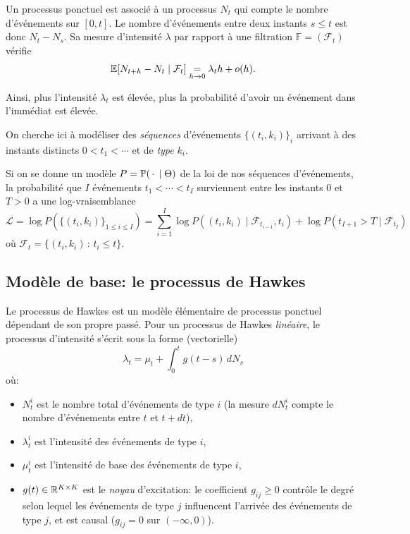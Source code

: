 \documentclass[../main.tex]{subfiles}
\begin{document}
Un processus ponctuel est associé à un processus $N_t$ qui compte le nombre d'événements sur $[0,t]$. Le nombre d'événements entre deux instants $s\leq t$ est donc $N_t - N_s$. Sa mesure d'intensité $\lambda$ par rapport à une filtration $\mathds F = (\mathcal{F}_t)$ vérifie\footnotemark
\[
	\mathbb{E} [N_{t+h} - N_t \mid \mathcal{F}_t] \underset{h\to 0}{=} \lambda_th + o(h).
\]

Ainsi, plus l'intensité $\lambda_t$ est élevée, plus la probabilité d'avoir un événement dans l'immédiat est élevée.

On cherche ici à modéliser des \textit{séquences} d'événements ${\{(t_i,k_i)\}}_i$ arrivant à des instants distincts $0<t_1 < \cdots$ et de \textit{type} $k_i$.

Si on se donne un modèle $P = \mathbb{P}(\,\cdot\,\mid \Theta)$ de la loi de nos séquences d'événements, la probabilité que $I$ événements $t_1<\cdots<t_I$ surviennent entre les instants $0$ et $T > 0$ a une log-vraisemblance
\begin{equation}\label{eq:likelihood}
	\mathcal{L} =
	\log P(\{(t_i,k_i)\}_{1\leq i\leq I}) =
	\sum_{i=1}^{I} \log P((t_i,k_i)\mid \mathcal{F}_{t_{i-1}}, t_i)
	+ \log P(t_{I+1}>T\mid \mathcal{F}_{t_{I}})
\end{equation}
où $\mathcal{F}_t = \{ (t_i,k_i)\,:\, t_i \leq t \}$.


\subsection{Modèle de base: le processus de Hawkes}

Le processus de Hawkes est un modèle élémentaire de processus ponctuel dépendant de son propre passé. Pour un processus de Hawkes \textit{linéaire}, le processus d'intensité s'écrit sous la forme (vectorielle)
\begin{equation}
\lambda_t = \mu_t + \int_0^t g(t-s)\,dN_s
\end{equation}
où:\begin{itemize}
	\item $N^i_t$ est le nombre total d'événements de type $i$ (la mesure $dN^i_t$ compte le nombre d'événements entre $t$ et $t+dt$),
	\item $\lambda_t^i$ est l'intensité des événements de type $i$,
	\item $\mu^i_t$ est l'intensité de base des événements de type $i$,
	\item $g(t) \in \mathbb{R}^{K\times K}$ est le \textit{noyau} d'excitation: le coefficient $g_{ij} \geq 0$ contrôle le degré selon lequel les événements de type $j$ influencent l'arrivée des événements de type $j$, et est causal ($g_{ij} = 0$ sur $(-\infty, 0)$).
\end{itemize} 
\end{document}
